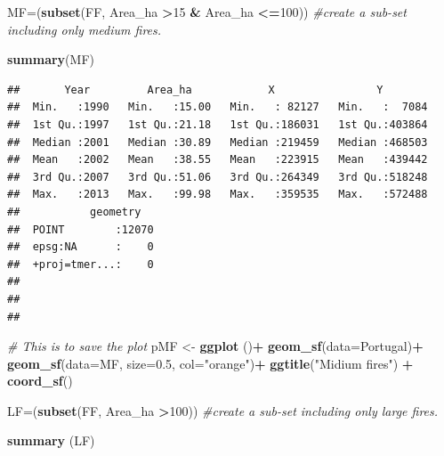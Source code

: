 \documentclass[
]{book}
\newenvironment{Shaded}{\begin{snugshade}}{\end{snugshade}}
\newcommand{\AttributeTok}[1]{\textcolor[rgb]{0.13,0.29,0.53}{#1}}
\newcommand{\CommentTok}[1]{\textcolor[rgb]{0.56,0.35,0.01}{\textit{#1}}}
\newcommand{\DecValTok}[1]{\textcolor[rgb]{0.00,0.00,0.81}{#1}}
\newcommand{\FloatTok}[1]{\textcolor[rgb]{0.00,0.00,0.81}{#1}}
\newcommand{\FunctionTok}[1]{\textcolor[rgb]{0.13,0.29,0.53}{\textbf{#1}}}
\newcommand{\NormalTok}[1]{#1}
\newcommand{\OtherTok}[1]{\textcolor[rgb]{0.56,0.35,0.01}{#1}}
\newcommand{\SpecialCharTok}[1]{\textcolor[rgb]{0.81,0.36,0.00}{\textbf{#1}}}
\newcommand{\StringTok}[1]{\textcolor[rgb]{0.31,0.60,0.02}{#1}}
\begin{document}
\begin{Shaded}
\begin{Highlighting}[]
\NormalTok{MF}\OtherTok{=}\NormalTok{(}\FunctionTok{subset}\NormalTok{(FF, Area\_ha }\SpecialCharTok{\textgreater{}}\DecValTok{15} \SpecialCharTok{\&}\NormalTok{ Area\_ha }\SpecialCharTok{\textless{}=}\DecValTok{100}\NormalTok{)) }\CommentTok{\#create a sub{-}set including only medium fires. }

\FunctionTok{summary}\NormalTok{(MF)}
\end{Highlighting}
\end{Shaded}

\begin{verbatim}
##       Year         Area_ha            X                Y         
##  Min.   :1990   Min.   :15.00   Min.   : 82127   Min.   :  7084  
##  1st Qu.:1997   1st Qu.:21.18   1st Qu.:186031   1st Qu.:403864  
##  Median :2001   Median :30.89   Median :219459   Median :468503  
##  Mean   :2002   Mean   :38.55   Mean   :223915   Mean   :439442  
##  3rd Qu.:2007   3rd Qu.:51.06   3rd Qu.:264349   3rd Qu.:518248  
##  Max.   :2013   Max.   :99.98   Max.   :359535   Max.   :572488  
##           geometry    
##  POINT        :12070  
##  epsg:NA      :    0  
##  +proj=tmer...:    0  
##                       
##                       
## 
\end{verbatim}

\begin{Shaded}
\begin{Highlighting}[]
\CommentTok{\# This is to save the plot }
\NormalTok{pMF }\OtherTok{\textless{}{-}} \FunctionTok{ggplot}\NormalTok{ ()}\SpecialCharTok{+}
  \FunctionTok{geom\_sf}\NormalTok{(}\AttributeTok{data=}\NormalTok{Portugal)}\SpecialCharTok{+}
  \FunctionTok{geom\_sf}\NormalTok{(}\AttributeTok{data=}\NormalTok{MF, }\AttributeTok{size=}\FloatTok{0.5}\NormalTok{, }\AttributeTok{col=}\StringTok{"orange"}\NormalTok{)}\SpecialCharTok{+}
 \FunctionTok{ggtitle}\NormalTok{(}\StringTok{"Midium fires"}\NormalTok{) }\SpecialCharTok{+}
 \FunctionTok{coord\_sf}\NormalTok{()}
\end{Highlighting}
\end{Shaded}

\begin{Shaded}
\begin{Highlighting}[]
\NormalTok{LF}\OtherTok{=}\NormalTok{(}\FunctionTok{subset}\NormalTok{(FF, Area\_ha }\SpecialCharTok{\textgreater{}}\DecValTok{100}\NormalTok{)) }\CommentTok{\#create a sub{-}set including only large fires.}

\FunctionTok{summary}\NormalTok{ (LF)}
\end{Highlighting}
\end{Shaded}
\end{document}
